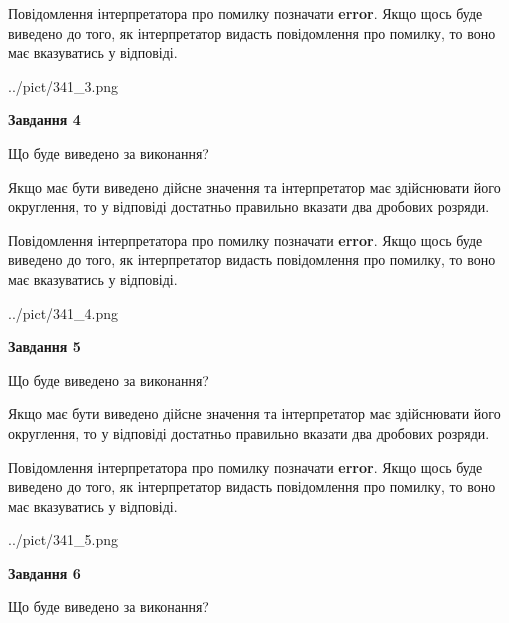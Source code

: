 \documentclass[12pt, ukrainian]{article}
\begin{document}
{\begin {Large}
Повідомлення інтерпретатора про помилку позначати \textbf{error}.
Якщо щось буде виведено до того, як інтерпретатор видасть повідомлення про помилку, 
то воно має вказуватись у відповіді. \par

\begin{center}
	{../pict/341_3.png}
\end{center}
\newpage

{\begin {center}\textbf{Завдання 4}\end {center}}\par
Що буде виведено за виконання? \par

Якщо має бути виведено дійсне значення та інтерпретатор має здійснювати його округлення, 
то у відповіді достатньо правильно вказати два дробових розряди.

Повідомлення інтерпретатора про помилку позначати \textbf{error}.
Якщо щось буде виведено до того, як інтерпретатор видасть повідомлення про помилку, 
то воно має вказуватись у відповіді. \par

\begin{center}
	{../pict/341_4.png}
\end{center}
\newpage

{\begin {center}\textbf{Завдання 5}\end {center}}\par
Що буде виведено за виконання? \par

Якщо має бути виведено дійсне значення та інтерпретатор має здійснювати його округлення, 
то у відповіді достатньо правильно вказати два дробових розряди.

Повідомлення інтерпретатора про помилку позначати \textbf{error}.
Якщо щось буде виведено до того, як інтерпретатор видасть повідомлення про помилку, 
то воно має вказуватись у відповіді. \par

\begin{center}
	{../pict/341_5.png}
\end{center}
\newpage

{\begin {center}\textbf{Завдання 6}\end {center}}\par
Що буде виведено за виконання? \par


\end{Large}}
\end{document}
